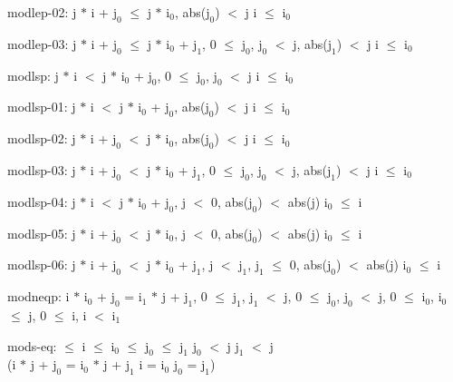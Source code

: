 \documentclass[a4paper]{article}
\begin{document}
\item	modlep-02: j $*$ i + $\mbox{j}_{0}$ $\le$ j $*$ $\mbox{i}_{0}$, abs($\mbox{j}_{0}$) $<$ j \Fol i $\le$ $\mbox{i}_{0}$

\item	modlep-03: j $*$ i + $\mbox{j}_{0}$ $\le$ j $*$ $\mbox{i}_{0}$ + $\mbox{j}_{1}$, 0 $\le$ $\mbox{j}_{0}$, $\mbox{j}_{0}$ $<$ j, abs($\mbox{j}_{1}$) $<$ j \Fol i $\le$ $\mbox{i}_{0}$

\item	modlsp: j $*$ i $<$ j $*$ $\mbox{i}_{0}$ + $\mbox{j}_{0}$, 0 $\le$ $\mbox{j}_{0}$, $\mbox{j}_{0}$ $<$ j \Fol i $\le$ $\mbox{i}_{0}$

\item	modlsp-01: j $*$ i $<$ j $*$ $\mbox{i}_{0}$ + $\mbox{j}_{0}$, abs($\mbox{j}_{0}$) $<$ j \Fol i $\le$ $\mbox{i}_{0}$

\item	modlsp-02: j $*$ i + $\mbox{j}_{0}$ $<$ j $*$ $\mbox{i}_{0}$, abs($\mbox{j}_{0}$) $<$ j \Fol i $\le$ $\mbox{i}_{0}$

\item	modlsp-03: j $*$ i + $\mbox{j}_{0}$ $<$ j $*$ $\mbox{i}_{0}$ + $\mbox{j}_{1}$, 0 $\le$ $\mbox{j}_{0}$, $\mbox{j}_{0}$ $<$ j, abs($\mbox{j}_{1}$) $<$ j \Fol i $\le$ $\mbox{i}_{0}$

\item	modlsp-04: j $*$ i $<$ j $*$ $\mbox{i}_{0}$ + $\mbox{j}_{0}$, j $<$ 0, abs($\mbox{j}_{0}$) $<$ abs(j) \Fol $\mbox{i}_{0}$ $\le$ i

\item	modlsp-05: j $*$ i + $\mbox{j}_{0}$ $<$ j $*$ $\mbox{i}_{0}$, j $<$ 0, abs($\mbox{j}_{0}$) $<$ abs(j) \Fol $\mbox{i}_{0}$ $\le$ i

\item	modlsp-06: j $*$ i + $\mbox{j}_{0}$ $<$ j $*$ $\mbox{i}_{0}$ + $\mbox{j}_{1}$, j $<$ $\mbox{j}_{1}$, $\mbox{j}_{1}$ $\le$ 0, abs($\mbox{j}_{0}$) $<$ abs(j) \Fol $\mbox{i}_{0}$ $\le$ i

\item	modneqp: i $*$ $\mbox{i}_{0}$ + $\mbox{j}_{0}$ = $\mbox{i}_{1}$ $*$ j + $\mbox{j}_{1}$, 0 $\le$ $\mbox{j}_{1}$, $\mbox{j}_{1}$ $<$ j, 0 $\le$ $\mbox{j}_{0}$, $\mbox{j}_{0}$ $<$ j, 0 $\le$ $\mbox{i}_{0}$, $\mbox{i}_{0}$ $\le$ j, 0 $\le$ i, i $<$ $\mbox{i}_{1}$ \Fol 

\item	mods-eq: \Fol {} $\le$ i  $\le$ $\mbox{i}_{0}$  $\le$ $\mbox{j}_{0}$  $\le$ $\mbox{j}_{1}$ \And $\mbox{j}_{0}$ $<$ j \And $\mbox{j}_{1}$ $<$ j \\
 \tabf \Imp (i $*$ j + $\mbox{j}_{0}$ = $\mbox{i}_{0}$ $*$ j + $\mbox{j}_{1}$ \Equiv i = $\mbox{i}_{0}$ \And $\mbox{j}_{0}$ = $\mbox{j}_{1}$)
\end{document}
